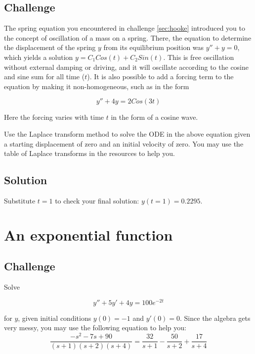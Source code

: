 \subsection*{Challenge}
The spring equation you encountered in challenge \ref{sec:hooke} introduced you to the concept of oscillation of a mass on a spring. There, the equation to determine the displacement of the spring $y$ from its equilibrium position was $y''+y=0$, which yields a solution $y=C_1 Cos(t) + C_2 Sin(t)$. This is free oscillation without external damping or driving, and it will oscillate according to the cosine and sine sum for all time ($t$). It is also possible to add a forcing term to the equation by making it non-homogeneous, such as in the form

\begin{equation}
    y'' + 4y = 2 Cos(3t)
\end{equation}

Here the forcing varies with time $t$ in the form of a cosine wave.

Use the Laplace transform method to solve the ODE in the above equation given a starting displacement of zero and an initial velocity of zero. You may use the table of Laplace transforms in the resources to help you.

\subsection*{Solution}
Substitute $t=1$ to check your final solution: $y(t=1)=0.2295$.




\newpage
\section{An exponential function}

\subsection*{Challenge}
Solve

\begin{equation}
    y''+5y'+4y=100e^{-2t}
\end{equation}

for $y$, given initial conditions $y(0)=-1$ and $y'(0)=0$. Since the algebra gets very messy, you may use the following equation to help you:
\begin{equation}
    \frac{-s^2-7s+90}{(s+1)(s+2)(s+4)} = \frac{32}{s+1} - \frac{50}{s+2} + \frac{17}{s+4}
\end{equation}

